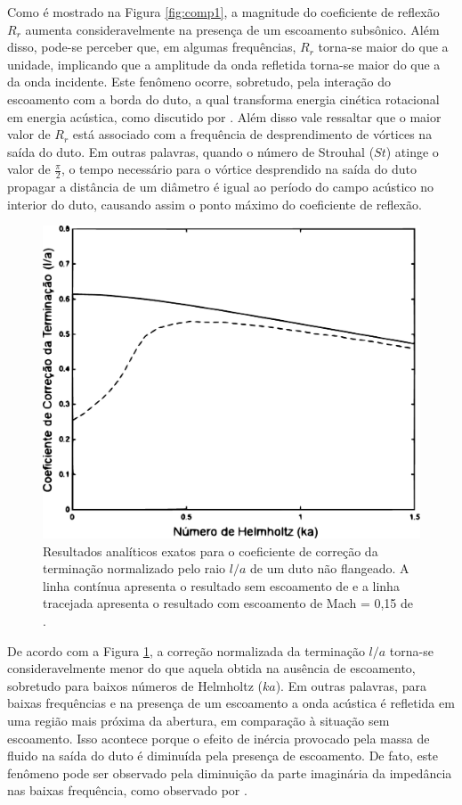 \newpage
Como é mostrado na Figura \ref{fig:comp1}, a magnitude do coeficiente de reflexão $R_{r}$ aumenta consideravelmente na presença de um escoamento subsônico. Além disso, pode-se perceber que, em algumas frequências, $R_{r}$ torna-se maior do que a unidade, implicando que a amplitude da onda refletida torna-se maior do que a da onda incidente. Este fenômeno ocorre, sobretudo, pela interação do escoamento com a borda do duto, a qual transforma energia cinética rotacional em energia acústica, como discutido por . Além disso vale ressaltar que o maior valor de $R_{r}$ está associado com a frequência de desprendimento de vórtices na saída do duto. Em outras palavras, quando o número de Strouhal ($St$) atinge o valor de $\frac{\pi}{2}$, o tempo necessário para o vórtice desprendido na saída do duto propagar a distância de um diâmetro é igual ao período do campo acústico no interior do duto, causando assim o ponto máximo do coeficiente de reflexão.

\begin{figure}[ht!]
\centering
  \includegraphics[width=.8\linewidth]{figuras/loa_comparacao.pdf}
  \caption[Coeficientes de correção de terminação $l/a$]{Resultados analíticos exatos para o coeficiente de correção da terminação normalizado pelo raio $l/a$ de um duto não flangeado. A linha contínua apresenta o resultado sem escoamento de  e a linha tracejada apresenta o resultado com escoamento de Mach = 0,15 de .}
  \label{fig:comp2}
\end{figure}

\newpage
De acordo com a Figura \ref{fig:comp2}, a correção normalizada da terminação $l/a$ torna-se consideravelmente menor do que aquela obtida na ausência de escoamento, sobretudo para baixos números de Helmholtz ($ka$). Em outras palavras, para baixas frequências e na presença de um escoamento a onda acústica é refletida em uma região mais próxima da abertura, em comparação à situação sem escoamento. Isso acontece porque o efeito de inércia provocado pela massa de fluido na saída do duto é diminuída pela presença de escoamento. De fato, este fenômeno pode ser observado pela diminuição da parte imaginária da impedância nas baixas frequência, como observado por .

